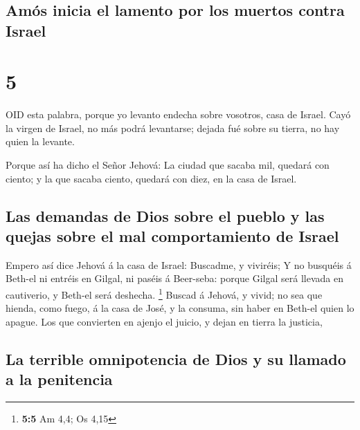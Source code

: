 \hypertarget{amuxf3s-inicia-el-lamento-por-los-muertos-contra-israel}{%
\subsection{Amós inicia el lamento por los muertos contra
Israel}\label{amuxf3s-inicia-el-lamento-por-los-muertos-contra-israel}}

\hypertarget{section-4}{%
\section{5}\label{section-4}}

 OID esta palabra, porque yo levanto endecha sobre vosotros,
casa de Israel.  Cayó la virgen de Israel, no más podrá
levantarse; dejada fué sobre su tierra, no hay quien la levante.

 Porque así ha dicho el Señor Jehová: La ciudad que sacaba
mil, quedará con ciento; y la que sacaba ciento, quedará con diez, en la
casa de Israel.

\hypertarget{las-demandas-de-dios-sobre-el-pueblo-y-las-quejas-sobre-el-mal-comportamiento-de-israel}{%
\subsection{Las demandas de Dios sobre el pueblo y las quejas sobre el
mal comportamiento de
Israel}\label{las-demandas-de-dios-sobre-el-pueblo-y-las-quejas-sobre-el-mal-comportamiento-de-israel}}

 Empero así dice Jehová á la casa de Israel: Buscadme, y
viviréis;  Y no busquéis á Beth-el ni entréis en Gilgal, ni
paséis á Beer-seba: porque Gilgal será llevada en cautiverio, y Beth-el
será deshecha. \footnote{\textbf{5:5} Am 4,4; Os 4,15} 
Buscad á Jehová, y vivid; no sea que hienda, como fuego, á la casa de
José, y la consuma, sin haber en Beth-el quien lo apague. 
Los que convierten en ajenjo el juicio, y dejan en tierra la justicia,

\hypertarget{la-terrible-omnipotencia-de-dios-y-su-llamado-a-la-penitencia}{%
\subsection{La terrible omnipotencia de Dios y su llamado a la
penitencia}\label{la-terrible-omnipotencia-de-dios-y-su-llamado-a-la-penitencia}}

